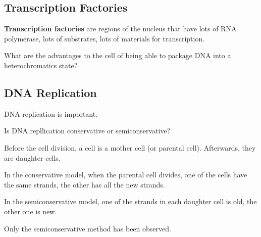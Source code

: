\documentclass[11pt]{scrartcl}
\begin{document}
\subsection{Transcription Factories}

\textbf{Transcription factories} are regions of the nucleus that have
lots of RNA polymerase, lots of substrates, lots of materials for
transcription.
\begin{ques*}

  What are the advantages to the cell of being able to package DNA
  into a heterochromatics state?

\end{ques*}

\subsection{DNA Replication}

DNA replication is important.

\begin{ques*}

Is DNA repllication conservative or semiconservative?

\end{ques*}

Before the cell division, a cell is a mother cell (or parental
cell). Afterwards, they are daughter cells.

In the conservative model, when the parental cell divides, one of the
cells have the same strands, the other has all the new strands.

In the semiconservative model, one of the strands in each daughter
cell is old, the other one is new.

Only the semiconservative method has been observed.
\end{document}
